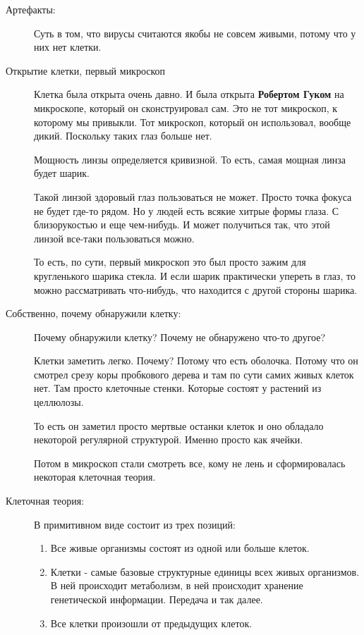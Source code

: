 \begin{description}
    \item[Артефакты:] Суть в том, что вирусы считаются якобы не совсем живыми, 
    потому что у них нет клетки. 

    \item[Открытие клетки, первый микроскоп]
    Клетка была открыта очень давно. И была открыта \textbf{Робертом
    Гуком} на микроскопе, который он сконструировал сам. Это не тот
    микроскоп, к которому мы привыкли. Тот микроскоп, который он использовал, вообще дикий.
    Поскольку таких глаз больше нет.
    
    Мощность линзы определяется кривизной. То есть, самая мощная линза будет шарик. 
    
    Такой линзой здоровый глаз пользоваться не может.
    Просто точка фокуса не будет где-то рядом. Но
    у людей есть всякие хитрые формы глаза. С
    близорукостью и еще чем-нибудь. И может получиться
    так, что этой линзой все-таки пользоваться можно.
    
    То есть, по сути, первый микроскоп это был
    просто зажим для кругленького шарика стекла.
    И если шарик практически упереть в глаз,
    то можно рассматривать что-нибудь, что находится
    с другой стороны шарика.

    \item[Собственно, почему обнаружили клетку:]
    
    Почему обнаружили клетку?
    Почему не обнаружено что-то другое?
    
    Клетки заметить легко. Почему? Потому что есть
    оболочка. Потому что он смотрел срезу
    коры пробкового дерева и там по сути самих живых
    клеток нет. Там просто
    клеточные стенки. Которые состоят у растений из целлюлозы.
    
    То есть он заметил просто мертвые останки клеток и
    оно обладало некоторой регулярной структурой. Именно просто как ячейки.
    
    Потом в микроскоп стали смотреть все, кому не лень и
    сформировалась некоторая клеточная теория.

    \item[Клеточная теория:]
    В примитивном виде состоит из трех позиций:
    \begin{enumerate}
    \item 
    Все живые организмы состоят из одной или больше клеток. 
    \item 
    Клетки - самые базовые структурные единицы всех живых организмов. 
    В ней происходит метаболизм, в ней происходит хранение генетической 
    информации. Передача и так далее. 
    \item 
    Все клетки произошли от предыдущих клеток. 
    \end{enumerate} 


\end{description}
